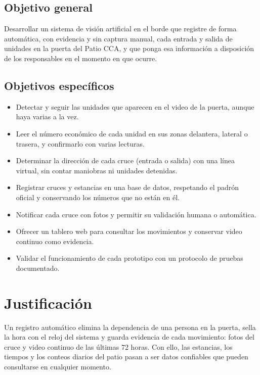 \subsection{Objetivo general}

Desarrollar un sistema de visión artificial en el borde que registre de
forma automática, con evidencia y sin captura manual, cada entrada y salida
de unidades en la puerta del Patio CCA, y que ponga esa información a
disposición de los responsables en el momento en que ocurre.

\subsection{Objetivos específicos}

\begin{itemize}
  \item Detectar y seguir las unidades que aparecen en el video de la
        puerta, aunque haya varias a la vez.
  \item Leer el número económico de cada unidad en sus zonas delantera,
        lateral o trasera, y confirmarlo con varias lecturas.
  \item Determinar la dirección de cada cruce (entrada o salida) con una
        línea virtual, sin contar maniobras ni unidades detenidas.
  \item Registrar cruces y estancias en una base de datos, respetando el
        padrón oficial y conservando los números que no están en él.
  \item Notificar cada cruce con fotos y permitir su validación humana o
        automática.
  \item Ofrecer un tablero web para consultar los movimientos y conservar
        video continuo como evidencia.
  \item Validar el funcionamiento de cada prototipo con un protocolo de
        pruebas documentado.
\end{itemize}

\section{Justificación}

Un registro automático elimina la dependencia de una persona en la puerta,
sella la hora con el reloj del sistema y guarda evidencia de cada
movimiento: fotos del cruce y video continuo de las últimas 72 horas. Con
ello, las estancias, los tiempos y los conteos diarios del patio pasan a
ser datos confiables que pueden consultarse en cualquier momento.

